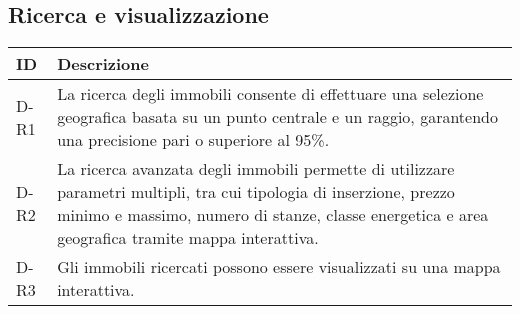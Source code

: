 \subsection*{Ricerca e visualizzazione}

\begin{table}[H]
    \centering
    \renewcommand{\arraystretch}{1.3} %
    
    \begin{tabular}{|p{3cm}|p{10cm}|} 
        \hline
        \textbf{ID} & \textbf{Descrizione} \\  
        \hline
        D-R1 &  La ricerca degli immobili consente di effettuare una selezione geografica basata su un punto centrale e un raggio, garantendo una precisione pari o superiore al 95\%. \\ 
        \hline
        D-R2 &  La ricerca avanzata degli immobili permette di utilizzare parametri multipli, tra cui tipologia di inserzione, prezzo minimo e massimo, numero di stanze, classe energetica e area geografica tramite mappa interattiva. \\ 
        \hline
        D-R3 &  Gli immobili ricercati possono essere visualizzati su una mappa interattiva. \\ 
        \hline
    \end{tabular}
    
\end{table}